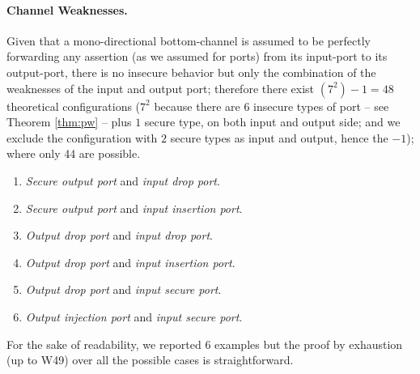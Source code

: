 \documentclass[runningheads]{llncs}
\begin{document}
\paragraph{Channel Weaknesses.}
Given that a mono-directional bottom-channel is assumed to be perfectly
forwarding any assertion (as we assumed for ports) from its input-port to its
output-port, there is no insecure behavior but only the combination of the
weaknesses of the input and output port; therefore there exist $(7^2)-1=48$
theoretical configurations ($7^2$ because there are $6$ insecure types of port -- see Theorem \ref{thm:pw} -- plus $1$ secure type, on both input and output side; and we exclude the
configuration with $2$ secure types as input and output, hence the $-1$); where only 44
are possible. 
\begin{enumerate}[start=6, label={W\arabic*)}]
	\item \emph{Secure output port} and \emph{input drop port}.
	\item \emph{Secure output port} and \emph{input insertion port}.
	\item \emph{Output drop port} and \emph{input drop port}.
	\item \emph{Output drop port} and \emph{input insertion port}.
	\item \emph{Output drop port} and \emph{input secure port}.
	\item \emph{Output injection port} and \emph{input secure port}.
\end{enumerate}

For the sake of readability, we reported 6 examples
but the proof by exhaustion (up to W49) over all the possible cases is
straightforward.
\end{document}
